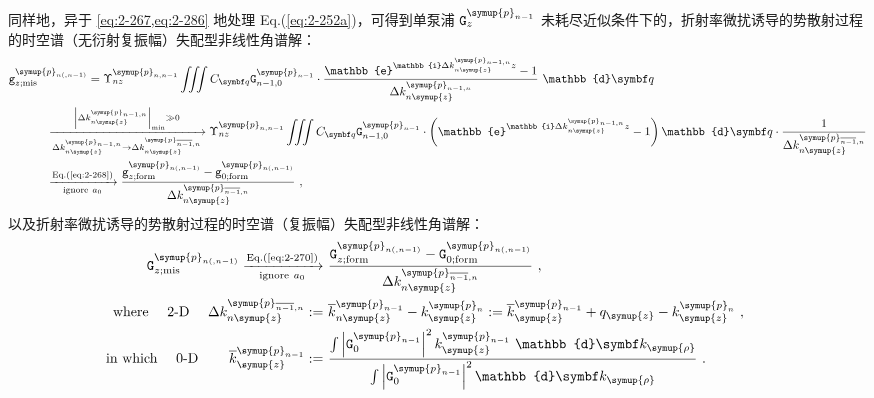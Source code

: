 同样地，异于 \cref{eq:2-267,eq:2-286} 地处理 Eq.(\ref{eq:2-252a})，可得到单泵浦 ${\mathtt{G}}^{\symup{p}_{n-1}}_{z}$ 未耗尽近似条件下的，折射率微扰诱导的势散射过程的时空谱（无衍射复振幅）失配型非线性角谱解：
\begin{subequations} \label{eq:2-292}
	\abovedisplayskip=13pt
	\belowdisplayskip=13pt
	\begin{align}
		{\mathtt{g}}^{\symup{p}_{n(,n-1)}}_{z;\text{mis}} &= \Upsilon^{\symup{p}_{n,n-1}}_{nz} \iiint C_{\symbf q} {\mathtt{G}}^{\symup{p}_{n-1}}_{n-1,0} \cdot \frac{ \mathbb{e}^{\mathbb{i} \Delta k^{\symup{p}_{n-1,n}}_{n\symup{z}} z} - 1 }{ \Delta k^{\symup{p}_{n-1,n}}_{n\symup{z}} } ~ \mathbb{d}{\symbf q} \label{eq:2-292a} \\ &\hspace{-3.5em} \xrightarrow[\Delta k^{\symup{p}_{n-1,n}}_{n\symup{z}} \to \Delta k^{\symup{p}_{\overline{n-1},n}}_{n\symup{z}}]{\left| \Delta k^{\symup{p}_{n-1,n}}_{n\symup{z}} \right|_{\min} \gg 0} \Upsilon^{\symup{p}_{n,n-1}}_{nz} \iiint C_{\symbf q} {\mathtt{G}}^{\symup{p}_{n-1}}_{n-1,0} \cdot \left( \mathbb{e}^{\mathbb{i} \Delta k^{\symup{p}_{n-1,n}}_{n\symup{z}} z} - 1 \right) \mathbb{d}{\symbf q} \cdot \frac{1}{\Delta k^{\symup{p}_{\overline{n-1},n}}_{n\symup{z}}} \label{eq:2-292b} \\ &\hspace{-3.5em} \xrightarrow[\text{ignore}\ a_0]{\text{Eq.(\ref{eq:2-268})}} \frac{ {\mathtt{g}}^{\symup{p}_{n(,n-1)}}_{z;\text{form}} - {\mathtt{g}}^{\symup{p}_{n(,n-1)}}_{0;\text{form}} }{ \Delta k^{\symup{p}_{\overline{n-1},n}}_{n\symup{z}} } \label{eq:2-292c}~,
	\end{align}
\end{subequations}
以及折射率微扰诱导的势散射过程的时空谱（复振幅）失配型非线性角谱解：
\begin{subequations} \label{eq:2-293}
	\abovedisplayskip=13pt
	\belowdisplayskip=13pt
	\begin{align}
		\hspace{-1.8em} {\mathtt{G}}^{\symup{p}_{n(,n-1)}}_{z;\text{mis}} \xrightarrow[\text{ignore}\ a_0]{\text{Eq.(\ref{eq:2-270})}} &\ \frac{ {\mathtt{G}}^{\symup{p}_{n(,n-1)}}_{z;\text{form}} - {\mathtt{G}}^{\symup{p}_{n(,n-1)}}_{0;\text{form}} }{ \Delta k^{\symup{p}_{\overline{n-1},n}}_{n\symup{z}} } \label{eq:2-293a}~, \\ \hspace{-1.8em} \text{where}\ \ \ \ \text{2-D}\ \ \ \ \Delta k^{\symup{p}_{\overline{n-1},n}}_{n\symup{z}} :=&\ \overline{k}^{\symup{p}_{n-1}}_{n\symup{z}} - k^{\symup{p}_{n}}_{\symup{z}} := \overline{k}^{\symup{p}_{n-1}}_{\symup{z}} + q_{\symup{z}} - k^{\symup{p}_{n}}_{\symup{z}} \label{eq:2-293b}~, \\ \hspace{-1.8em} \text{in which} \ \ \ \ \text{0-D} \hspace{2.2em} \overline{k}^{\symup{p}_{n-1}}_{\symup{z}} :=&\ \frac{ \int \left| {\mathtt{G}}^{\symup{p}_{n-1}}_{0} \right|^2 k^{\symup{p}_{n-1}}_{\symup{z}} ~ \mathbb{d}{\symbf k_{\symup{\rho}}} }{ \int \left| {\mathtt{G}}^{\symup{p}_{n-1}}_{0} \right|^2 \mathbb{d}{\symbf k_{\symup{\rho}}} } \label{eq:2-293c}~.
	\end{align}
\end{subequations}

